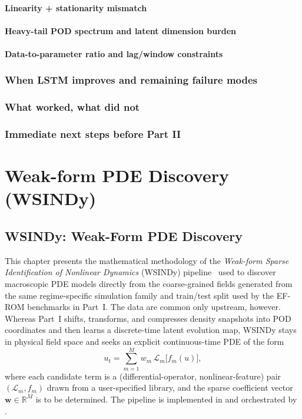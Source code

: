 \documentclass{report}
\theoremstyle{plain}
\theoremstyle{remark}
\numberwithin{equation}{section}              %
\begin{document}
\subsection{Linearity + stationarity mismatch}
\subsection{Heavy-tail POD spectrum and latent dimension burden}
\subsection{Data-to-parameter ratio and lag/window constraints}
\section{When LSTM improves and remaining failure modes}
\section{What worked, what did not}
\section{Immediate next steps before Part II}
 
%
\part{Weak-form PDE Discovery (WSINDy)}

%
%
%
%
\chapter{WSINDy: Weak-Form PDE Discovery}
\label{ch:wsindy_methodology}

This chapter presents the mathematical methodology of the
\emph{Weak-form Sparse Identification of Nonlinear Dynamics} (WSINDy)
pipeline~\cite{messenger2021wsindy} used to discover macroscopic PDE
models directly from the coarse-grained fields generated from the same
regime-specific simulation family and train/test split used by the EF-ROM
benchmarks in Part~I\@.  The data are common only upstream, however.
Whereas Part~I shifts, transforms, and compresses density snapshots into POD
coordinates and then learns a discrete-time latent evolution map, WSINDy stays
in physical field space and seeks an explicit continuous-time PDE of the form
\begin{equation}
  u_t = \sum_{m=1}^{M} w_m\,\mathcal{L}_m\!\bigl[f_m(u)\bigr],
  \label{eq:wsindy_general}
\end{equation}
where each candidate term is a (differential-operator, nonlinear-feature)
pair $(\mathcal{L}_m, f_m)$ drawn from a user-specified library, and the
sparse coefficient vector $\mathbf{w}\in\mathbb{R}^M$ is to be determined.
The pipeline is implemented in  and orchestrated by
.
\end{document}

